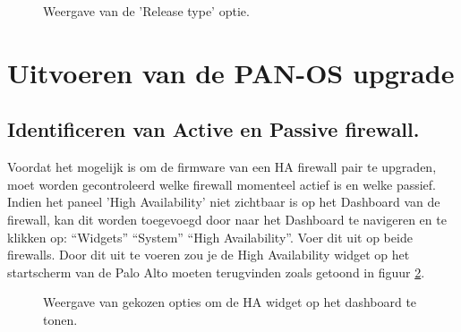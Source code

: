 \begin{figure}[H]
    \centering
    \caption[PA Support Homescreen]{\label{fig:PA_seriesKiezen} Weergave van de 'Release type' optie.}
\end{figure}


\section{Uitvoeren van de PAN-OS upgrade}
\subsection{Identificeren van Active en Passive firewall.}
\label{punt:DownloadenCorrectePanVersie}

Voordat het mogelijk is om de firmware van een HA firewall pair te upgraden, moet worden gecontroleerd welke firewall momenteel actief is en welke passief. Indien het paneel 'High Availability' niet zichtbaar is op het Dashboard van de firewall, kan dit worden toegevoegd door naar het Dashboard te navigeren en te klikken op:  
“Widgets” \rightarrow “System”  \rightarrow “High Availability”. Voer dit uit op beide firewalls.
Door dit uit te voeren zou je de High Availability widget op het startscherm van de Palo Alto moeten terugvinden zoals getoond in figuur \ref{fig:PA_High_Availability_Widget}.

\begin{figure}[H]
    \centering
    \caption[PA High Availability Widget]{\label{fig:PA_High_Availability_Widget} Weergave van gekozen opties om de HA widget op het dashboard te tonen.}
\end{figure}

